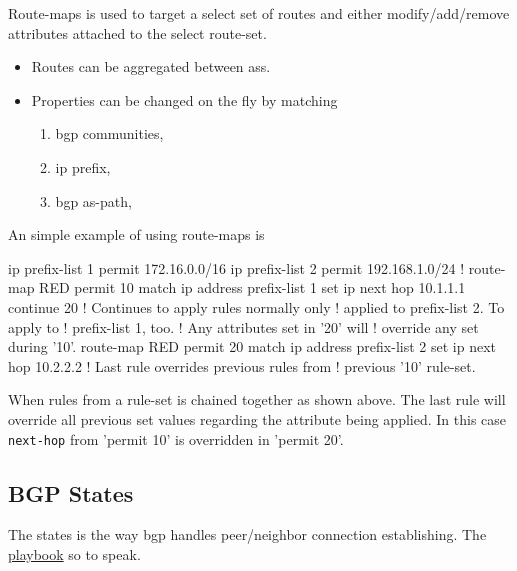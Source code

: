 Route-maps is used to target a select set of routes and either modify/add/remove attributes attached to the select route-set.

\begin{itemize}
    \item Routes can be aggregated between \glspl{as}.
    \item Properties can be changed on the fly by matching
    \begin{enumerate}[label={\alph*)}]
        \item \Gls{bgp} communities,
        \item \Gls{ip} prefix,
        \item \Gls{bgp} as-path,
    \end{enumerate}
\end{itemize}

An simple example of using route-maps is

\begin{cisco}
ip prefix-list 1 permit 172.16.0.0/16
ip prefix-list 2 permit 192.168.1.0/24
!
route-map RED permit 10
 match ip address prefix-list 1
 set ip next hop 10.1.1.1
 continue 20              ! Continues to apply rules normally only
                          ! applied to prefix-list 2. To apply to
                          ! prefix-list 1, too.
                          ! Any attributes set in '20' will
                          ! override any set during '10'.
route-map RED permit 20
 match ip address prefix-list 2
 set ip next hop 10.2.2.2 ! Last rule overrides previous rules from
                          ! previous '10' rule-set.
\end{cisco}

When rules from a rule-set is chained together as shown above. The last rule will override all previous set values regarding the attribute being applied. In this case \texttt{next-hop} from 'permit 10' is overridden in 'permit 20'.

\subsection[States]{BGP States}

The states is the way \gls{bgp} handles peer/neighbor connection establishing. The \underline{playbook} so to speak.

